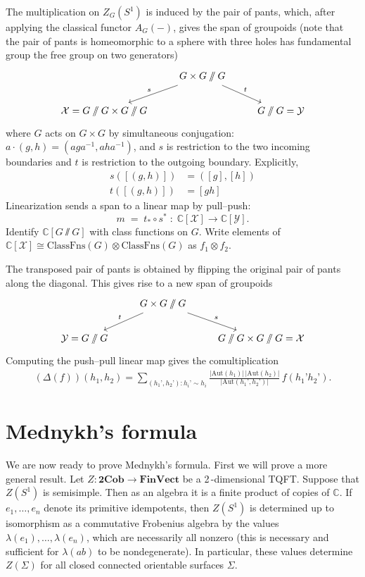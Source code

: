 \documentclass[12pt]{article}
\begin{document}
\begin{example}
The multiplication on $Z_G(S^1)$ is induced by the pair of pants, which, after applying the classical functor $A_G(-)$, gives the span of groupoids (note that the pair of pants is homeomorphic to a sphere with three holes has fundamental group the free group on two generators)
\[
\begin{tikzcd}
& G\times G \sslash G \arrow[dl, "s"'] \arrow[dr, "t"] & \\
\cX = G\sslash G \times G\sslash G & & G\sslash G = \cY
\end{tikzcd}
\]
where $G$ acts on $G\times G$ by simultaneous conjugation:
$a\cdot(g,h)=(aga^{-1},aha^{-1})$, and $s$ is restriction to the two incoming boundaries and $t$ is restriction to the outgoing boundary. Explicitly,
\begin{align*}
s([(g,h)]) & = ([g],[h]) \\
t([(g,h)]) & = [gh]
\end{align*}
Linearization sends a span to a linear map by pull--push:
\[m \;=\; t_* \circ s^* \;:\; \mathbb{C}[\mathcal X]\longrightarrow \mathbb{C}[\mathcal Y].\]
Identify $\mathbb{C}[G\sslash G]$ with class functions on $G$. Write elements of
$\mathbb{C}[\mathcal X]\cong \mathrm{ClassFns}(G)\otimes \mathrm{ClassFns}(G)$ as $f_1\otimes f_2$.
\end{example}

\begin{example}
The transposed pair of pants is obtained by flipping the original pair of pants along the diagonal. This gives rise to a new span of groupoids
\[
\begin{tikzcd}
& G\times G \sslash G \arrow[dl, "t"'] \arrow[dr, "s"] & \\
\cY = G\sslash G  & & G\sslash G \times G\sslash G = \cX
\end{tikzcd}
\]
Computing the push--pull linear map gives the comultiplication
\begin{align*}
    (\Delta(f))(h_1,h_2) = \sum_{(h_1’,h_2’): h_i’ \sim h_i}
\frac{|\mathrm{Aut}(h_1)|\,|\mathrm{Aut}(h_2)|}{|\mathrm{Aut}(h_1’,h_2’)|}
\,f(h_1’h_2’).
\end{align*}
\end{example}

\section{Mednykh's formula}
We are now ready to prove Mednykh’s formula. First we will prove a more general result.
Let $Z:\mathbf{2Cob}\to \mathbf{FinVect}$ be a 2\,-dimensional TQFT. Suppose that $Z(S^1)$ is semisimple.
Then as an algebra it is a finite product of copies of $\mathbb{C}$. If $e_1,\dots,e_n$ denote its primitive
idempotents, then $Z(S^1)$ is determined up to isomorphism as a commutative Frobenius
algebra by the values $\lambda(e_1),\dots,\lambda(e_n)$, which are necessarily all nonzero (this is necessary and
sufficient for $\lambda(ab)$ to be nondegenerate). In particular, these values determine $Z(\Sigma)$ for all
closed connected orientable surfaces $\Sigma$.
\end{document}
